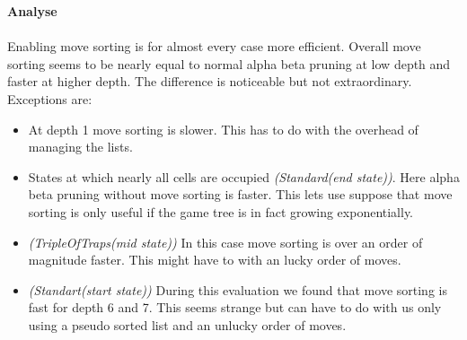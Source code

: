 \newpage

{\Large \textbf{Analyse}}\\\\
Enabling move sorting is for almost every case more efficient. Overall move sorting seems to be nearly equal to normal alpha beta pruning at low depth and faster at higher depth. The difference is noticeable but not extraordinary.\\
Exceptions are:\\
\begin{itemize}
	\item At depth 1 move sorting is slower. This has to do with the overhead of managing the lists.
	\item States at which nearly all cells are occupied \textit{(Standard(end state))}. Here alpha beta pruning without move sorting is faster. This lets use suppose that move sorting is only useful if the game tree is in fact growing exponentially.
	\item \textit{(TripleOfTraps(mid state))} In this case move sorting is over an order of magnitude faster. This might have to with an lucky order of moves.
	\item \textit{(Standart(start state))} During this evaluation we found that move sorting is fast for depth 6 and 7. This seems strange but can have to do with us only using a pseudo sorted list and an unlucky order of moves.
\end{itemize}


